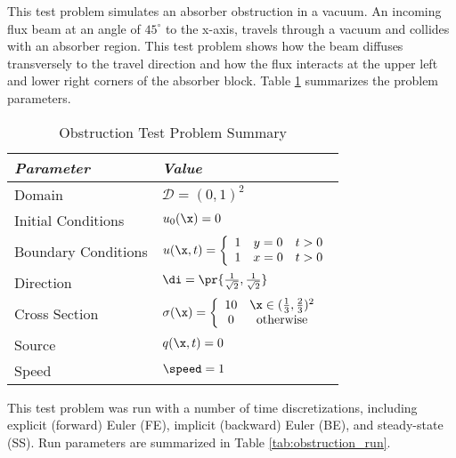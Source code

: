 This test problem simulates an absorber obstruction in a vacuum.
An incoming flux beam at an angle of $45^\circ$ to the x-axis, travels
through a vacuum and collides with an absorber region. This test
problem shows how the beam diffuses transversely to the travel direction
and how the flux interacts at the upper left and lower right corners
of the absorber block.
Table \ref{tab:obstruction} summarizes the problem parameters.

\begin{table}[htb]\caption{Obstruction Test Problem Summary}
\label{tab:obstruction}
\centering
\begin{tabular}{l l}\toprule
\emph{Parameter} & \emph{Value}\\\midrule
Domain & $\mathcal{D} = (0,1)^2$\\
Initial Conditions & $u_0(\x)=0$\\
Boundary Conditions & $u(\x,t)=\left\{\begin{array}{c c c}
  1 & y = 0 & t > 0\\
  1 & x = 0 & t > 0
  \end{array}\right.$\\
Direction & $\di = \pr{\frac{1}{\sqrt{2}},\frac{1}{\sqrt{2}}}$\\
Cross Section & $\sigma(\x)=\left\{\begin{array}{c c}
    10 & \x \in (\frac{1}{3},\frac{2}{3})^2\\
    0  & \mbox{otherwise}
  \end{array}\right.$\\
Source & $q(\x,t)=0$\\
Speed & $\speed=1$\\
\bottomrule\end{tabular}
\end{table}

This test problem was run with a number of time discretizations, including
explicit (forward) Euler (FE), implicit (backward) Euler (BE), and steady-state (SS).
Run parameters are summarized in Table \ref{tab:obstruction_run}.

